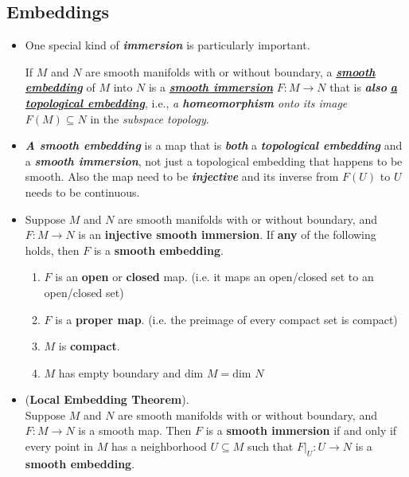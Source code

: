\documentclass[11pt]{article}
\begin{document}
\subsection{Embeddings}
\begin{itemize}
\item  One special kind of \emph{\textbf{immersion}} is particularly important.
\begin{definition}
If $M$ and $N$ are smooth manifolds with or without boundary, a  \underline{\emph{\textbf{smooth embedding}}} of $M$ into $N$ is a \underline{\emph{\textbf{smooth immersion}}} $F: M \rightarrow N$ that is \emph{\textbf{also}} \underline{\emph{\textbf{a topological embedding}}}, i.e., \emph{a \textbf{homeomorphism} onto its image} $F(M) \subseteq N$ in the \emph{subspace topology}. 
\end{definition}

\item \begin{remark}
\emph{\textbf{A smooth embedding}} is a map that is \emph{\textbf{both}} a \emph{\textbf{topological embedding}} and a \emph{\textbf{smooth immersion}}, not just a topological embedding that happens to be smooth. Also the map need to be \emph{\textbf{injective}} and its inverse from $F(U)$ to $U$ needs to be continuous.
\end{remark}

\item \begin{proposition}
Suppose $M$ and $N$ are smooth manifolds with or without boundary, and $F: M \rightarrow N$ is an \textbf{injective smooth immersion}. If \textbf{any} of the following holds, then $F$ is a\textbf{ smooth embedding}.
\begin{enumerate}
\item $F$ is an \textbf{open} or \textbf{closed} map. (i.e. it maps an open/closed set to an open/closed set)
\item $F$ is a \textbf{proper map}. (i.e. the preimage of every compact set is compact)
\item $M$ is \textbf{compact}.
\item $M$ has empty boundary and $\text{dim }M = \text{dim }N$
\end{enumerate}
\end{proposition}

\item \begin{theorem} (\textbf{Local Embedding Theorem}).\\
Suppose $M$ and $N$ are smooth manifolds with or without boundary, and $F: M \rightarrow N$ is a smooth map. Then $F$ is a \textbf{smooth immersion} if and only if every point in $M$ has a neighborhood $U\subseteq M$ such that $F|_{U}: U \rightarrow N$ is a \textbf{smooth embedding}.
\end{theorem}
\end{itemize}
\end{document}
